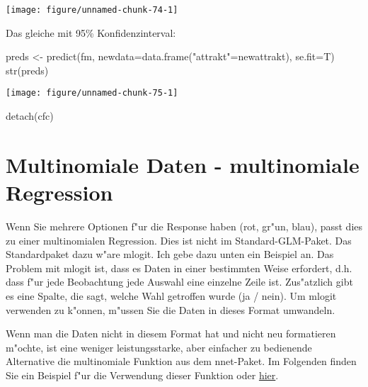 \documentclass[a4paper,twoside]{tufte-book}\usepackage[]{graphicx}\usepackage[]{color}
\makeatletter
\def\maxwidth{ %
  \ifdim\Gin@nat@width>\linewidth
    \linewidth
  \else
    \Gin@nat@width
  \fi
}
\makeatother
\begin{document}
\begin{appendices}
\begin{Schunk}
\texttt{[image: figure/unnamed-chunk-74-1]} \end{Schunk}

Das gleiche mit 95\% Konfidenzinterval:

\begin{Schunk}
\begin{Sinput}
preds <- predict(fm, newdata=data.frame("attrakt"=newattrakt), se.fit=T)
str(preds)
\end{Sinput}

\texttt{[image: figure/unnamed-chunk-75-1]} \begin{Sinput}
detach(cfc)
\end{Sinput}
\end{Schunk}



\section{Multinomiale Daten - multinomiale Regression}

Wenn Sie mehrere Optionen f"ur die Response haben (rot, gr"un, blau), passt dies zu einer multinomialen Regression. Dies ist nicht im Standard-GLM-Paket. Das Standardpaket dazu w"are mlogit. Ich gebe dazu unten ein Beispiel an. Das Problem mit mlogit ist, dass es Daten in einer bestimmten Weise erfordert, d.h. dass f"ur jede Beobachtung jede Auswahl eine einzelne Zeile ist. Zus"atzlich gibt es eine Spalte, die sagt, welche Wahl getroffen wurde (ja / nein). Um mlogit verwenden zu k"onnen, m"ussen Sie die Daten in dieses Format umwandeln.

Wenn man die Daten nicht in diesem Format hat und nicht neu formatieren m"ochte, ist eine weniger leistungsstarke, aber einfacher zu bedienende Alternative die multinomiale Funktion aus dem nnet-Paket. Im Folgenden finden Sie ein Beispiel f"ur die Verwendung dieser Funktion oder \href{http://www.ats.ucla.edu/stat/stata/dae/mlogit.htm}{hier}.


\end{appendices}
\end{document}
